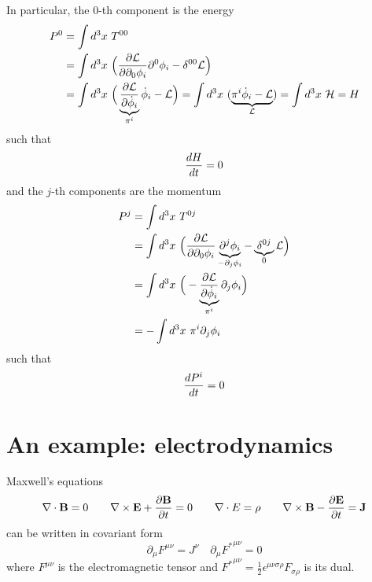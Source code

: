     In particular, the $0$-th component is the energy 
    \begin{equation}\label{energ}
    \begin{aligned}
        P^0 & = \int d^3 x ~ T^{00} \\ & = \int d^3 x ~ \Big ( \frac{\partial\mathcal L}{\partial\partial_0 \phi_i} \partial^0 \phi_i - \delta^{0 0} \mathcal L \Big) \\ & = \int d^3 x ~ \Big ( \underbrace{\frac{\partial\mathcal L}{\partial\dot \phi_i}}_{\pi^i} \dot \phi_i - \mathcal L \Big ) = \int d^3 x ~ (\underbrace{\pi^i \dot \phi_i - \mathcal L}_{\mathcal L}) = \int d^3 x ~ \mathcal H = H
    \end{aligned}
    \end{equation}
    such that 
    \begin{equation*}
        \frac{dH}{dt} = 0
    \end{equation*} 
    and the $j$-th components are the momentum 
    \begin{equation}\label{momen}
    \begin{aligned}
        P^j & = \int d^3 x ~ T^{0j} \\ & = \int d^3 x ~ \Big ( \frac{\partial\mathcal L}{\partial\partial_0 \phi_i} \underbrace{\partial^j \phi_i}_{-\partial_j \phi_i} - \underbrace{\delta^{0j}}_0 \mathcal L \Big) \\ & = \int d^3 x ~ \Big ( - \underbrace{\frac{\partial\mathcal L}{\partial\dot \phi_i}}_{\pi^i} \partial_j \phi_i \Big) \\ & = - \int d^3 x ~ \pi^i \partial_j \phi_i
    \end{aligned}
    \end{equation}
    such that 
    \begin{equation*}
        \frac{dP^i}{dt} = 0
    \end{equation*}

\chapter{An example: electrodynamics}

    Maxwell's equations 
    \begin{equation}\label{eqmax}
        \nabla \cdot \mathbf B = 0 \qquad \nabla \times \mathbf E + \frac{\partial\mathbf B}{\partial t} = 0 \qquad \nabla \cdot E = \rho \qquad \nabla \times \mathbf B - \frac{\partial\mathbf E}{\partial t} = \mathbf J
    \end{equation}
    can be written in covariant form 
    \begin{equation*}
        \partial_\mu F^{\mu\nu} = J^\nu \quad \partial_\mu {F^*}^{\mu\nu} = 0
    \end{equation*}
    where $F^{\mu\nu}$ is the electromagnetic tensor and ${F^*}^{\mu\nu} = \frac{1}{2} \epsilon^{\mu\nu\sigma\rho} F_{\sigma\rho}$ is its dual. 

